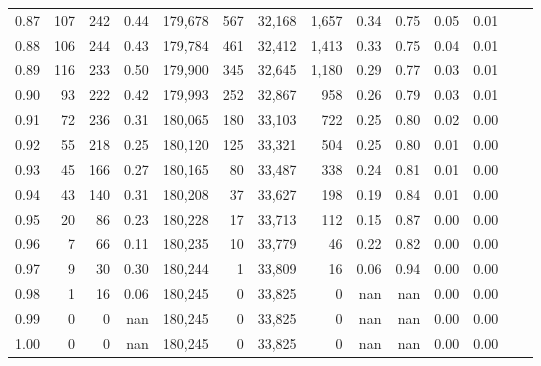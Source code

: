 \begin{tabular}{rrrrrrrrrrrrrr}
0.87 &    107 &  242 &    0.44 &  179,678 &      567 &  32,168 &   1,657 &  0.34 &  0.75 &  0.05 &      0.01 \\
0.88 &    106 &  244 &    0.43 &  179,784 &      461 &  32,412 &   1,413 &  0.33 &  0.75 &  0.04 &      0.01 \\
0.89 &    116 &  233 &    0.50 &  179,900 &      345 &  32,645 &   1,180 &  0.29 &  0.77 &  0.03 &      0.01 \\
0.90 &     93 &  222 &    0.42 &  179,993 &      252 &  32,867 &     958 &  0.26 &  0.79 &  0.03 &      0.01 \\
0.91 &     72 &  236 &    0.31 &  180,065 &      180 &  33,103 &     722 &  0.25 &  0.80 &  0.02 &      0.00 \\
0.92 &     55 &  218 &    0.25 &  180,120 &      125 &  33,321 &     504 &  0.25 &  0.80 &  0.01 &      0.00 \\
0.93 &     45 &  166 &    0.27 &  180,165 &       80 &  33,487 &     338 &  0.24 &  0.81 &  0.01 &      0.00 \\
0.94 &     43 &  140 &    0.31 &  180,208 &       37 &  33,627 &     198 &  0.19 &  0.84 &  0.01 &      0.00 \\
0.95 &     20 &   86 &    0.23 &  180,228 &       17 &  33,713 &     112 &  0.15 &  0.87 &  0.00 &      0.00 \\
0.96 &      7 &   66 &    0.11 &  180,235 &       10 &  33,779 &      46 &  0.22 &  0.82 &  0.00 &      0.00 \\
0.97 &      9 &   30 &    0.30 &  180,244 &        1 &  33,809 &      16 &  0.06 &  0.94 &  0.00 &      0.00 \\
0.98 &      1 &   16 &    0.06 &  180,245 &        0 &  33,825 &       0 &   nan &   nan &  0.00 &      0.00 \\
0.99 &      0 &    0 &     nan &  180,245 &        0 &  33,825 &       0 &   nan &   nan &  0.00 &      0.00 \\
1.00 &      0 &    0 &     nan &  180,245 &        0 &  33,825 &       0 &   nan &   nan &  0.00 &      0.00 \\
\bottomrule
\end{tabular}
